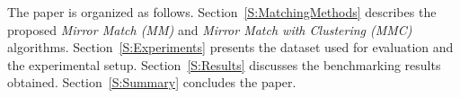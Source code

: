 \documentclass[conference]{IEEEtran}
\begin{document}
%
%

The paper is organized as follows.  Section~\ref{S:MatchingMethods} 
describes the proposed \emph{Mirror Match (MM)} and \emph{Mirror Match 
with Clustering (MMC)} algorithms.  Section~\ref{S:Experiments} presents 
the dataset used for evaluation and the experimental setup.  
Section~\ref{S:Results} discusses the benchmarking results obtained.  
Section~\ref{S:Summary} concludes the paper.  
\end{document}
